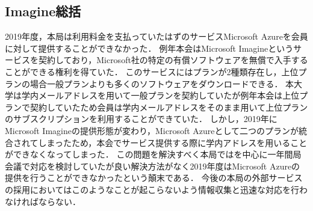 \subsection*{Imagine総括}

2019年度，本局は利用料金を支払っていたはずのサービスMicrosoft Azureを会員に対して提供することができなかった．
例年本会はMicrosoft Imagineというサービスを契約しており，Microsoft社の特定の有償ソフトウェアを無償で入手することができる権利を得ていた．
このサービスにはプランが2種類存在し，上位プランの場合一般プランよりも多くのソフトウェアをダウンロードできる．
本大学は学内メールアドレスを用いて一般プランを契約していたが例年本会は上位プランで契約していたため会員は学内メールアドレスをそのまま用いて上位プランのサブスクリプションを利用することができていた．
しかし，2019年にMicrosoft Imagineの提供形態が変わり，Microsoft Azureとして二つのプランが統合されてしまったため，本会でサービス提供する際に学内アドレスを用いることができなくなってしまった．
この問題を解決すべく本局では\thirdGrade{}を中心に一年間局会議で対応を検討していたが良い解決方法がなく2019年度はMicrosoft Azureの提供を行うことができなかったという顛末である．
今後の本局の外部サービスの採用においてはこのようなことが起こらないよう情報収集と迅速な対応を行わなければならない．
